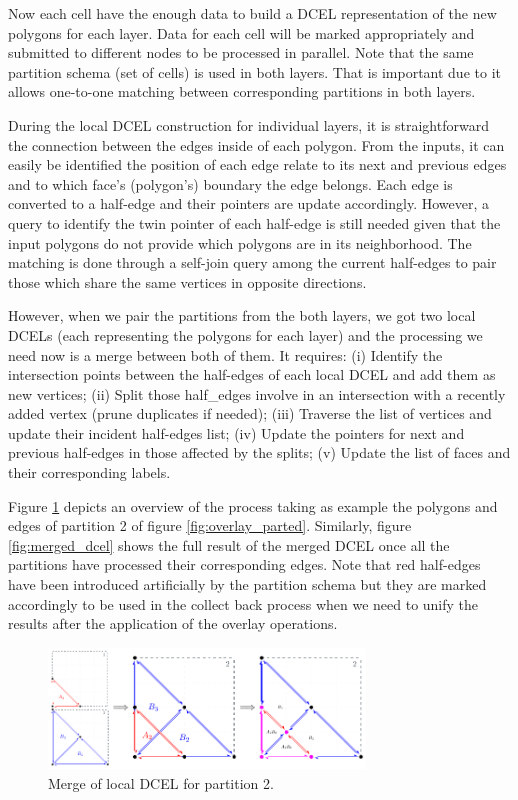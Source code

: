Now each cell have the enough data to build a DCEL representation of the new polygons for each layer.  Data for each cell will be marked appropriately and submitted to different nodes to be processed in parallel.  Note that the same partition schema (set of cells) is used in both layers.  That is important due to it allows one-to-one matching between corresponding partitions in both layers.

During the local DCEL construction for individual layers, it is straightforward the connection between the edges inside of each polygon.  From the inputs, it can easily be identified the position of each edge relate to its next and previous edges and to which face's (polygon's) boundary the edge belongs.  Each edge is converted to a half-edge and their pointers are update accordingly.  However, a query to identify the twin pointer of each half-edge is still needed given that the input polygons do not provide which polygons are in its neighborhood. The matching is done through a self-join query among the current half-edges to pair those which share the same vertices in opposite directions.

However, when we pair the partitions from the both layers, we got two local DCELs (each representing the polygons for each layer) and the processing we need now is a merge between both of them.  It requires: (i) Identify the intersection points between the half-edges of each local DCEL and add them as new vertices; (ii) Split those half\_edges involve in an intersection with a recently added vertex (prune duplicates if needed); (iii) Traverse the list of vertices and update their incident half-edges list; (iv) Update the pointers for next and previous half-edges in those affected by the splits; (v) Update the list of faces and their corresponding labels.

Figure \ref{fig:part2} depicts an overview of the process taking as example the polygons and edges of partition 2 of figure \ref{fig:overlay_parted}.  Similarly, figure \ref{fig:merged_dcel} shows the full result of the merged DCEL once all the partitions have processed their corresponding edges. Note that red half-edges have been introduced artificially by the partition schema but they are marked accordingly to be used in the collect back process when we need to unify the results after the application of the overlay operations.

\begin{figure}[!ht]
    \centering
    \includegraphics[width=0.75\textwidth]{figures/02-Part2}
    \caption{Merge of local DCEL for partition 2.}\label{fig:part2}
\end{figure}

